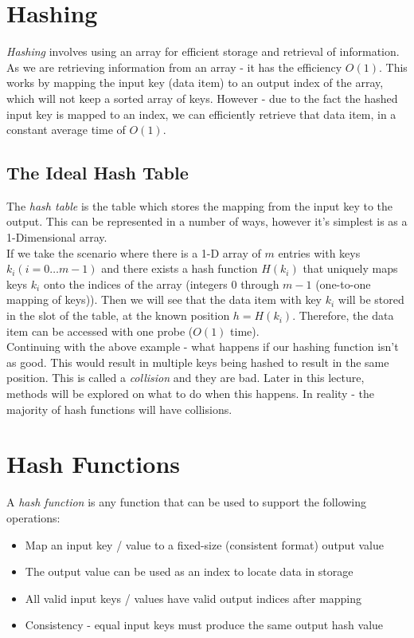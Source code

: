 
\section{Hashing}
\textit{Hashing} involves using an array for efficient storage and retrieval of information. As we are retrieving information from an array - it has the efficiency $O(1)$. This works by mapping the input key (data item) to an output index of the array, which will not keep a sorted array of keys. However - due to the fact the hashed input key is mapped to an index, we can efficiently retrieve that data item, in a constant average time of $O(1)$. 
\subsection{The Ideal Hash Table}
The \textit{hash table} is the table which stores the mapping from the input key to the output. This can be represented in a number of ways, however it's simplest is as a 1-Dimensional array.\\

If we take the scenario where there is a 1-D array of $m$ entries with keys $k_i (i=0 \ldots m-1)$ and there exists a hash function $H(k_i)$ that uniquely maps keys $k_i$ onto the indices of the array (integers $0$ through $m-1$ (one-to-one mapping of keys)). Then we will see that the data item with key $k_i$ will be stored in the slot of the table, at the known position $h = H(k_i)$. Therefore, the data item can be accessed with one probe ($O(1)$ time).\\

Continuing with the above example - what happens if our hashing function isn't as good. This would result in multiple keys being hashed to result in the same position. This is called a \textit{collision} and they are bad. Later in this lecture, methods will be explored on what to do when this happens. In reality - the majority of hash functions will have collisions.

\section{Hash Functions}
A \textit{hash function} is any function that can be used to support the following operations:
\begin{itemize}
    \item Map an input key / value to  a fixed-size (consistent format) output value
    \item The output value can be used as an index to locate data in storage
    \item All valid input keys / values have valid output indices after mapping
    \item Consistency - equal input keys must produce the same output hash value
\end{itemize}


